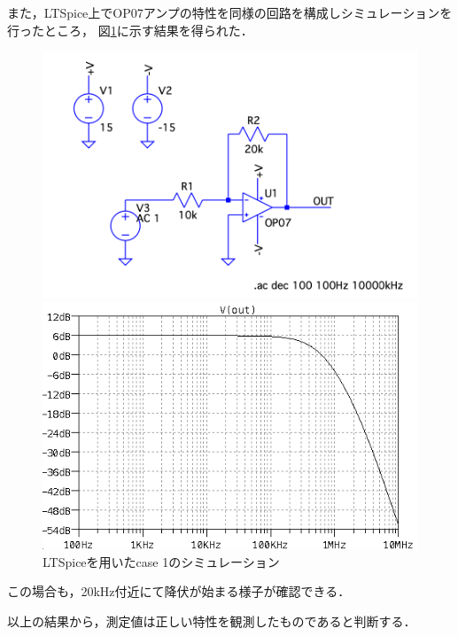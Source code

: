 \documentclass[dvipdfmx,titlepage,a4j]{jsarticle}  %
\begin{document}
また，LTSpice上でOP07アンプの特性を同様の回路を構成しシミュレーションを行ったところ，
図\ref{fig:gr:case1sim}に示す結果を得られた．
\begin{figure}[H]
  \centering
  \begin{minipage}{8cm}
    \centering
    \includegraphics[keepaspectratio, scale=0.2]{../image/case1sim.png}
  \end{minipage}
  \begin{minipage}{8cm}
    \centering
    \includegraphics[keepaspectratio, scale=0.35]{../image/case1simout.png}
  \end{minipage}
  \caption{LTSpiceを用いたcase 1のシミュレーション}
  \label{fig:gr:case1sim}
\end{figure}
この場合も，20kHz付近にて降伏が始まる様子が確認できる．

以上の結果から，測定値は正しい特性を観測したものであると判断する．
\end{document}
